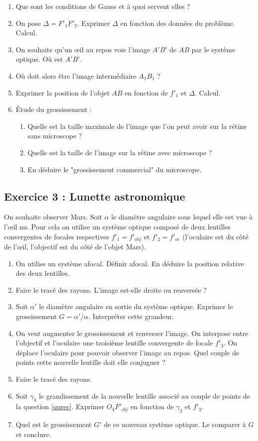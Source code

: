 \begin{enumerate}
	\item Que sont les conditions de Gauss et à quoi servent elles ?
	\item On pose $\Delta = \overline{F'_1F'_2}$. Exprimer $\Delta$ en fonction des données du problème. Calcul.
	\item On souhaite qu'un œil au repos voie l'image $A'B'$ de $AB$ par le système optique. Où est $A'B'$.
	\item Où doit alors être l'image intermédiaire $A_1B_1$ ?
	\item Exprimer la position de l'objet $AB$ en fonction de $f'_1$ et $\Delta$. Calcul.
	\item Étude du grossissement :
	\begin{enumerate}
		\item Quelle est la taille maximale de l'image que l'on peut avoir sur la rétine sans microscope ?
		\item Quelle est la taille de l'image sur la rétine avec microscope ?
		\item En déduire le "grossissement commercial" du microscope.
	\end{enumerate}
\end{enumerate}

\subsection{Exercice 3 : Lunette astronomique}

On souhaite observer Mars. Soit $\alpha$ le diamètre angulaire sous lequel elle est vue à l'œil nu. Pour cela on utilise un système optique composé de deux lentilles convergentes de focales respectives $f'_1=f'_{obj}$ et $f'_2=f'_{oc}$ (l'oculaire est du côté de l'œil, l'objectif est du côté de l'objet Mars).

\begin{enumerate}
	\item On utilise un système afocal. Définir afocal. En déduire la position relative des deux lentilles.
	\item Faire le tracé des rayons. L'image est-elle droite ou renversée ?
	\item Soit $\alpha'$ le diamètre angulaire en sortie du système optique. Exprimer le grossissement $G = \alpha'/\alpha$. Interpréter cette grandeur.
	\item \label{qprec} On veut augmenter le grossissement et renverser l'image. On interpose entre l'objectif et l'oculaire une troisième lentille convergente de focale $f'_3$. On déplace l'oculaire pour pouvoir observer l'image au repos. Quel couple de points cette nouvelle lentille doit elle conjuguer ?
	\item Faire le tracé des rayons.
	\item Soit $\gamma_3$ le grandissement de la nouvelle lentille associé au couple de points de la question \ref{qprec}. Exprimer $\overline{O_3F'_{obj}}$ en fonction de $\gamma_3$ et $f'_3$.
	\item Quel est le grossissement $G'$ de ce nouveau système optique. Le comparer à $G$ et conclure.
\end{enumerate}


